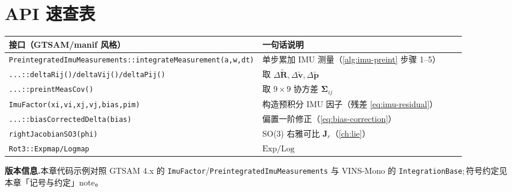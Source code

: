 \section*{API 速查表}
\begin{table}[H]\centering\small
\begin{tabular}{p{0.40\linewidth}p{0.50\linewidth}}
\toprule
接口（GTSAM/manif 风格）& 一句话说明 \\
\midrule
\texttt{PreintegratedImuMeasurements::integrateMeasurement(a,w,dt)} & 单步累加 IMU 测量（\cref{alg:imu-preint} 步骤 1--5） \\
\texttt{...::deltaRij()/deltaVij()/deltaPij()} & 取 $\Delta\tilde{\mathbf R},\Delta\tilde{\mathbf v},\Delta\tilde{\mathbf p}$ \\
\texttt{...::preintMeasCov()} & 取 $9\times9$ 协方差 $\boldsymbol\Sigma_{ij}$ \\
\texttt{ImuFactor(xi,vi,xj,vj,bias,pim)} & 构造预积分 IMU 因子（残差 \cref{eq:imu-residual}） \\
\texttt{...::biasCorrectedDelta(bias)} & 偏置一阶修正（\cref{eq:bias-correction}） \\
\texttt{rightJacobianSO3(phi)} & SO(3) 右雅可比 $\mathbf J_r$（\cref{ch:lie}） \\
\texttt{Rot3::Expmap/Logmap} & $\mathrm{Exp}/\mathrm{Log}$ \\
\bottomrule
\end{tabular}
\end{table}

\noindent\textbf{版本信息.}\;本章代码示例对照 GTSAM 4.x 的 \texttt{ImuFactor}/\texttt{PreintegratedImuMeasurements} 与 VINS-Mono 的 \texttt{IntegrationBase};\,符号约定见本章「记号与约定」note。
